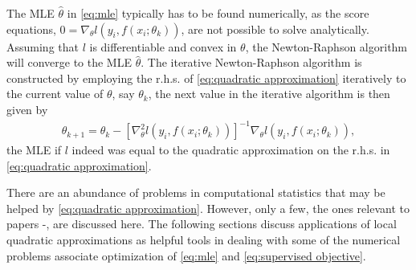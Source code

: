 \begin{Example}\label{ex:newton-raphson}
	The MLE $\hat{\theta}$ in \eqref{eq:mle} typically has to be found numerically, as 
	the score equations, $0=\nabla_\theta l(y_i,f(x_i;\theta_k))$, are not possible to solve 
	analytically. Assuming that $l$ is differentiable and convex in $\theta$, the Newton-Raphson algorithm will converge to the MLE $\hat{\theta}$. 
	The iterative Newton-Raphson algorithm is constructed by employing the r.h.s. of \eqref{eq:quadratic approximation} iteratively to the current value of $\theta$, say $\theta_k$, the next value in the iterative algorithm is then given by 
	\begin{align*}
		\theta_{k+1} = \theta_k 
		- \left[\nabla_\theta^2 l(y_i,f(x_i;\theta_k))\right]^{-1}
		\nabla_\theta l(y_i,f(x_i;\theta_k)),
	\end{align*}
	the MLE if $l$ indeed was equal to the quadratic approximation on the r.h.s. in \eqref{eq:quadratic approximation}.
\end{Example}

There are an abundance of problems in computational statistics that may be helped by \eqref{eq:quadratic approximation}. However, only a few, the ones relevant to papers -, are discussed here.
The following sections discuss applications of local quadratic approximations as helpful tools in dealing with some of the numerical problems associate optimization of \eqref{eq:mle} and \eqref{eq:supervised objective}.



